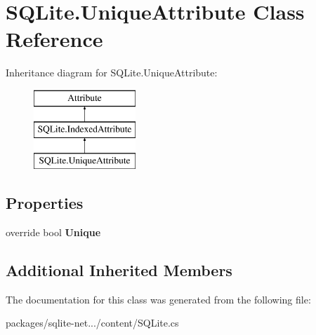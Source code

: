 \hypertarget{classSQLite_1_1UniqueAttribute}{}\section{S\+Q\+Lite.\+Unique\+Attribute Class Reference}
\label{classSQLite_1_1UniqueAttribute}
Inheritance diagram for S\+Q\+Lite.\+Unique\+Attribute\+:\begin{figure}[H]
\begin{center}
\leavevmode
\includegraphics[height=3.000000cm]{classSQLite_1_1UniqueAttribute}
\end{center}
\end{figure}
\subsection*{Properties}
\begin{DoxyCompactItemize}
\item 
\hypertarget{classSQLite_1_1UniqueAttribute_a7be9750f13a84999b4a53c45b1f84250}{}override bool {\bfseries Unique}\label{classSQLite_1_1UniqueAttribute_a7be9750f13a84999b4a53c45b1f84250}

\end{DoxyCompactItemize}
\subsection*{Additional Inherited Members}


The documentation for this class was generated from the following file\+:\begin{DoxyCompactItemize}
\item 
packages/sqlite-\/net.../content/S\+Q\+Lite.\+cs\end{DoxyCompactItemize}
